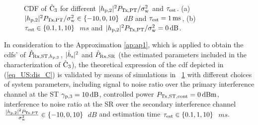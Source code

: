 \begin{figure}[!ht]
{\label{fig_US:CDF_C1_s}}
\hfil
{}
\vspace{0.3cm}
\caption{CDF of $\hat{\text{{C}}}_{\text{3}}$ for different $|h_{\text{p,2}}|^2 P_{\text{Tx,PT}}/\sigma^2_{\text{w}}$ and $\tau_{\text{est}}$. (a) $|h_{\text{p,2}}|^2 P_{\text{Tx,PT}}/\sigma^2_{\text{w}} \in \{-10, 0, 10\}$ $\SI{}{dB}$ and $\tau_{\text{est}} = \SI{1}{ms}$, (b) $\tau_{\text{est}} \in \{0.1, 1, 10\}$ $\SI{}{ms}$ and $|h_{\text{p,2}}|^2 P_{\text{Tx,PT}}/\sigma^2_{\text{w}} = \SI{0}{dB}$.}%
\label{fig_US:CDF_eca}
\vspace{-0.5cm}
\end{figure}
In consideration to the Approximation \ref{ap:ap1}, which is applied to obtain the cdfs' of $\hat{P}_{\text{Rx,ST,$h_{\text{p,3}}$}}$, $|\hat{h}_{\text{s}}|^2$ and $\hat{P}_{\text{Rx,SR}}$ (the estimated parameters included in the characterization of $\hat{\text{{C}}}_{\text{3}}$), the theoretical expression of the cdf depicted in (\ref{eq_US:dis_C}) is validated by means of simulations in \figurename~\ref{fig_US:CDF_eca} with different choices of system parameters, including signal to noise ratio over the primary interference channel at the ST ${\gamma}_{\text{p,3}} = \SI{10}{dB}$, controlled power $P_{\text{Tx,ST,cont}} = \SI{0}{dBm}$, interference to noise ratio at the SR over the secondary interference channel $\frac{|h_{\text{p,2}}|^2 P_{\text{Tx,PT}}}{\sigma^2_{\text{w}}} \in \{-10, 0, 10\}$ $\SI{}{dB}$ and estimation time $\tau_{\text{est}} \in \{0.1, 1, 10\}$ $\SI{}{ms}$.

